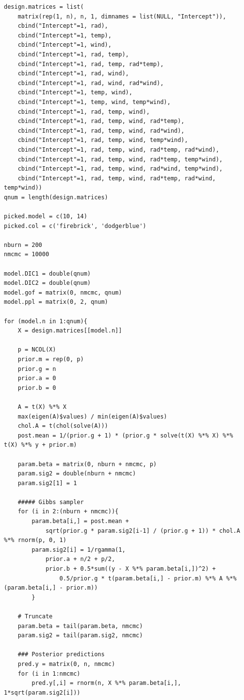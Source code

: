 \documentclass{asaproc}
\begin{document}
\begin{scriptsize}
\begin{verbatim}
design.matrices = list(
    matrix(rep(1, n), n, 1, dimnames = list(NULL, "Intercept")),
    cbind("Intercept"=1, rad),
    cbind("Intercept"=1, temp),
    cbind("Intercept"=1, wind),
    cbind("Intercept"=1, rad, temp),
    cbind("Intercept"=1, rad, temp, rad*temp),
    cbind("Intercept"=1, rad, wind),
    cbind("Intercept"=1, rad, wind, rad*wind),
    cbind("Intercept"=1, temp, wind),
    cbind("Intercept"=1, temp, wind, temp*wind),
    cbind("Intercept"=1, rad, temp, wind),
    cbind("Intercept"=1, rad, temp, wind, rad*temp),
    cbind("Intercept"=1, rad, temp, wind, rad*wind),
    cbind("Intercept"=1, rad, temp, wind, temp*wind),
    cbind("Intercept"=1, rad, temp, wind, rad*temp, rad*wind),
    cbind("Intercept"=1, rad, temp, wind, rad*temp, temp*wind),
    cbind("Intercept"=1, rad, temp, wind, rad*wind, temp*wind),
    cbind("Intercept"=1, rad, temp, wind, rad*temp, rad*wind, temp*wind))
qnum = length(design.matrices)

picked.model = c(10, 14)
picked.col = c('firebrick', 'dodgerblue')

nburn = 200
nmcmc = 10000

model.DIC1 = double(qnum)
model.DIC2 = double(qnum)
model.gof = matrix(0, nmcmc, qnum)
model.ppl = matrix(0, 2, qnum)

for (model.n in 1:qnum){
    X = design.matrices[[model.n]]

    p = NCOL(X)
    prior.m = rep(0, p)
    prior.g = n
    prior.a = 0
    prior.b = 0

    A = t(X) %*% X
    max(eigen(A)$values) / min(eigen(A)$values)
    chol.A = t(chol(solve(A)))
    post.mean = 1/(prior.g + 1) * (prior.g * solve(t(X) %*% X) %*% t(X) %*% y + prior.m)

    param.beta = matrix(0, nburn + nmcmc, p)
    param.sig2 = double(nburn + nmcmc)
    param.sig2[1] = 1

    ##### Gibbs sampler
    for (i in 2:(nburn + nmcmc)){
        param.beta[i,] = post.mean +
            sqrt(prior.g * param.sig2[i-1] / (prior.g + 1)) * chol.A %*% rnorm(p, 0, 1)
        param.sig2[i] = 1/rgamma(1,
            prior.a + n/2 + p/2, 
            prior.b + 0.5*sum((y - X %*% param.beta[i,])^2) +
                0.5/prior.g * t(param.beta[i,] - prior.m) %*% A %*% (param.beta[i,] - prior.m))
        }

    # Truncate
    param.beta = tail(param.beta, nmcmc)
    param.sig2 = tail(param.sig2, nmcmc)

    ### Posterior predictions
    pred.y = matrix(0, n, nmcmc)
    for (i in 1:nmcmc)
        pred.y[,i] = rnorm(n, X %*% param.beta[i,], 1*sqrt(param.sig2[i]))


\end{verbatim}
\end{scriptsize}
\end{document}

